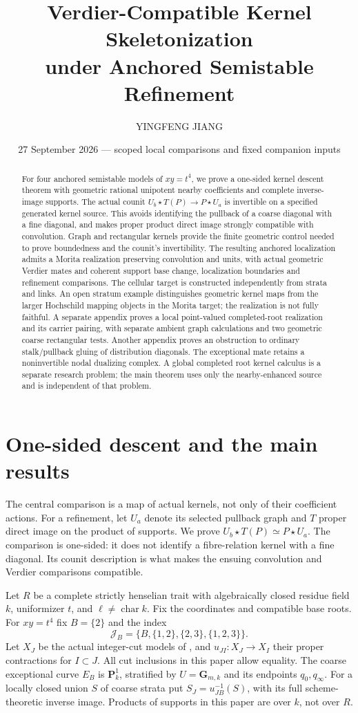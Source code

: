 \documentclass[11pt]{article}
\title{Verdier-Compatible Kernel Skeletonization\\under Anchored Semistable Refinement}
\author{YINGFENG JIANG}
\date{27 September 2026 --- scoped local comparisons and fixed companion inputs}
\theoremstyle{definition}
\theoremstyle{remark}
\begin{document}
\maketitle
\begin{abstract}
For four anchored semistable models of $xy=t^4$, we prove a one-sided
kernel descent theorem with geometric rational unipotent nearby
coefficients and complete inverse-image supports.  The actual counit
$U_b\star T(P)\to P\star U_a$ is invertible on a specified generated
kernel source.  This avoids identifying the pullback of a coarse
diagonal with a fine diagonal, and makes proper product direct image
strongly compatible with convolution.  Graph and rectangular kernels
provide the finite geometric control needed to prove boundedness
and the counit's invertibility.  The resulting anchored localization
admits a Morita realization preserving convolution and units, with
actual geometric Verdier mates and coherent support base change,
localization boundaries and refinement comparisons.  The cellular
target is constructed independently from strata and links.  An open
stratum example distinguishes geometric kernel maps from the larger
Hochschild mapping objects in the Morita target; the realization is
not fully faithful.  A separate appendix proves a local
point-valued completed-root realization and its carrier pairing,
with separate ambient graph calculations and two geometric coarse
rectangular tests.  Another appendix proves an obstruction to
ordinary stalk/pullback gluing of distribution diagonals.  The exceptional
mate retains a noninvertible nodal dualizing complex.  A global completed
root kernel calculus is a separate research problem; the main theorem
uses only the nearby-enhanced source and is independent of that problem.
\end{abstract}

\section{One-sided descent and the main results}
The central comparison is a map of actual kernels, not only of their
coefficient actions.  For a refinement, let $U_a$ denote its selected
pullback graph and $T$ proper direct image on the product of supports.
We prove $U_b\star T(P)\simeq P\star U_a$.  The comparison is
one-sided: it does not identify a fibre-relation kernel with a fine
diagonal.  Its counit description is what makes the ensuing
convolution and Verdier comparisons compatible.


Let $R$ be a complete strictly henselian trait with algebraically closed
residue field $k$, uniformizer $t$, and $\ell\ne\operatorname{char}k$.
Fix the coordinates and compatible base roots.  For $xy=t^4$ fix
$B=\{2\}$ and the index
\[
 \mathcal J_B=\{B,\{1,2\},\{2,3\},\{1,2,3\}\}.
\]
Let $X_J$ be the actual integer-cut models of \cite{Refinement}, and
$u_{JI}:X_J\to X_I$ their proper contractions for $I\subset J$.
All cut inclusions in this paper allow equality.
The coarse exceptional curve $E_B$ is $\mathbf P^1_k$, stratified by
$U=\mathbf G_{m,k}$ and its endpoints $q_0,q_\infty$.
For a locally closed union $S$ of coarse strata put
$S_J=u_{JB}^{-1}(S)$, with its full scheme-theoretic inverse image.
Products of supports in this paper are over $k$, not over $R$.
\end{document}
